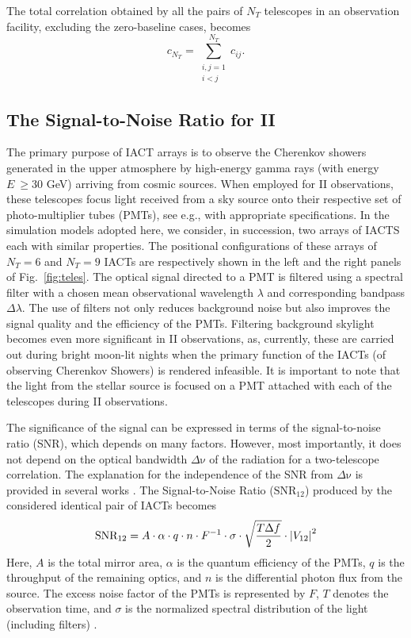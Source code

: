 The total correlation obtained by all the pairs of $N_T$ telescopes in an observation facility, excluding the zero-baseline cases, becomes
\begin{equation}
c_{N_T} = \sum_{\substack{i,j =1 \\ i<j}}^{N_T}  c_{ij}.
\label{eqn:total-corr}
\end{equation}

\subsection{The Signal-to-Noise Ratio for II}
The primary purpose of IACT arrays is to observe the Cherenkov showers generated in the upper atmosphere by high-energy gamma rays (with energy $E\ \geq 30$ GeV) arriving from cosmic sources. When employed for II observations, these telescopes focus light received from a sky source onto their respective set of photo-multiplier tubes (PMTs), see e.g., \citep{aleksic2016major} with appropriate specifications. In the simulation models adopted here, we consider, in succession, two arrays of IACTS each with similar properties. The positional configurations of these arrays of $N_T=6$ and $N_T =9$ IACTs are respectively shown in the left and the right panels of Fig.~\ref{fig:teles}. The optical signal directed to a PMT is filtered using a spectral filter with a chosen mean observational wavelength $\lambda$ and corresponding bandpass $\Delta \lambda$. The use of filters not only reduces background noise but also improves the signal quality and the efficiency of the PMTs. Filtering background skylight becomes even more significant in II observations, as, currently, these are carried out during bright moon-lit nights when the primary function of the IACTs (of observing Cherenkov Showers) is rendered infeasible. It is important to note that the light from the stellar source is focused on a PMT attached with each of the telescopes during II observations.


The significance of the signal can be expressed in terms of the signal-to-noise ratio (SNR), which depends on many factors. However, most importantly, it does not depend on the optical bandwidth $\Delta {\mathrm {\nu}}$ of the radiation for a two-telescope correlation. The explanation for the independence of the SNR from $\Delta {\mathrm {\nu}}$ is provided in several works \citep[e.g., subsection 4.1 of][]{10.1093/mnras/stab2391}. The Signal-to-Noise Ratio ($\mathrm{SNR_{12}}$) produced by the considered identical pair of IACTs becomes
\begin{equation}
	{\mathrm {SNR_{12}}} = A \cdot \alpha \cdot q \cdot n \cdot F^{-1} \cdot \sigma \cdot \sqrt{\frac{T \Delta f}{2}} \cdot \abs{V_{12}}^{2}
	\label{eq:SNR}
\end{equation}
Here, $A$ is the total mirror area, $\alpha$ is the quantum efficiency of the PMTs, $q$ is the throughput of the remaining optics, and $n$ is the differential photon flux from the source. The excess noise factor of the PMTs is represented by $F$, $T$ denotes the observation time, and $\sigma$ is the normalized spectral distribution of the light (including filters) \citep[see e.g.,][]{acciari2020optical}.

